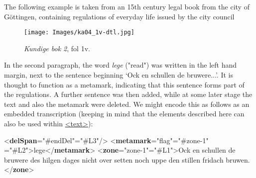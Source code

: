 The following example is taken from an 15th century legal book from the city of Göttingen, containing regulations of everyday life issued by the city council \begin{figure}[htbp]
\noindent\noindent\texttt{[image: Images/ka04\_1v-dtl.jpg]}
\caption{\textit{Kundige bok 2}, fol 1v.}\end{figure}
\par
In the second paragraph, the word \textit{lege} ("read") was written in the left hand margin, next to the sentence beginning ‘Ock en schullen de bruwere...’. It is thought to function as a metamark, indicating that this sentence forms part of the regulations. A further sentence was then added, while at some later stage the text and also the metamark were deleted. We might encode this as follows as an embedded transcription (keeping in mind that the elements described here can also be used within \hyperref[TEI.text]{<text>}): \par\bgroup{}\exampleFont \begin{shaded}\noindent\mbox{}{<\textbf{delSpan}\hspace*{1em}{spanTo}="{\#endDel}"\hspace*{1em}{change}="{\#L3}"/>}\mbox{}\newline 
{<\textbf{metamark}\hspace*{1em}{function}="{flag}"\hspace*{1em}{target}="{\#zone-1}"\mbox{}\newline 
\hspace*{1em}{change}="{\#L2}">}lege{</\textbf{metamark}>}\mbox{}\newline 
{<\textbf{zone}\hspace*{1em}{xml:id}="{zone-1}"\hspace*{1em}{change}="{\#L1}">}Ock en schullen de bruwere des hilgen dages\mbox{}\newline 
 nicht over setten noch uppe den stillen fridach bruwen.{</\textbf{zone}>}\mbox{}\newline 

\end{shaded}
